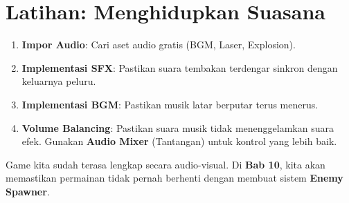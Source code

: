 
\section{Latihan: Menghidupkan Suasana}

\begin{enumerate}
    \item \textbf{Impor Audio}: Cari aset audio gratis (BGM, Laser, Explosion).
    \item \textbf{Implementasi SFX}: Pastikan suara tembakan terdengar sinkron dengan keluarnya peluru.
    \item \textbf{Implementasi BGM}: Pastikan musik latar berputar terus menerus.
    \item \textbf{Volume Balancing}: Pastikan suara musik tidak menenggelamkan suara efek. Gunakan \textbf{Audio Mixer} (Tantangan) untuk kontrol yang lebih baik.
\end{enumerate}

Game kita sudah terasa lengkap secara audio-visual. Di \textbf{Bab 10}, kita akan memastikan permainan tidak pernah berhenti dengan membuat sistem \textbf{Enemy Spawner}.
